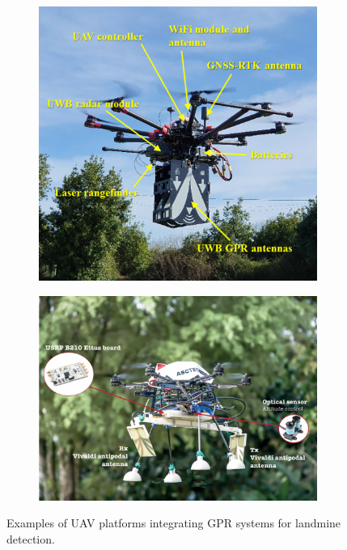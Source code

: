 \begin{figure}[h!]
    \centering
    \begin{subfigure}[b]{0.48\linewidth}
        \centering
        \includegraphics[width=\linewidth]{figs/Huirui/gpr_drone1.png}
        \label{fig:gpr_drone1}
    \end{subfigure}
    \hfill
    \begin{subfigure}[b]{0.48\linewidth}
        \centering
        \includegraphics[width=\linewidth]{figs/Huirui/gpr_drone2.png}
        \label{fig:gpr_drone2}
    \end{subfigure}
    \caption{Examples of UAV platforms integrating GPR systems for landmine detection.~\cite{garcia2022safedrone,cerquera2017uav}}
    \label{fig:gpr_uav_examples}
\end{figure}

